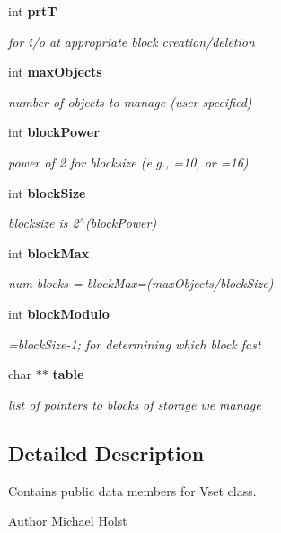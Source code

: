 \begin{DoxyCompactItemize}
int {\bf prtT}
\begin{DoxyCompactList}\small\item\em for i/o at appropriate block creation/deletion \item\end{DoxyCompactList}\item 
int {\bf maxObjects}
\begin{DoxyCompactList}\small\item\em number of objects to manage (user specified) \item\end{DoxyCompactList}\item 
int {\bf blockPower}
\begin{DoxyCompactList}\small\item\em power of 2 for blocksize (e.g., =10, or =16) \item\end{DoxyCompactList}\item 
int {\bf blockSize}
\begin{DoxyCompactList}\small\item\em blocksize is 2$^\wedge$(blockPower) \item\end{DoxyCompactList}\item 
int {\bf blockMax}
\begin{DoxyCompactList}\small\item\em num blocks = blockMax=(maxObjects/blockSize) \item\end{DoxyCompactList}\item 
int {\bf blockModulo}
\begin{DoxyCompactList}\small\item\em =blockSize-\/1; for determining which block fast \item\end{DoxyCompactList}\item 
char $\ast$$\ast$ {\bf table}
\begin{DoxyCompactList}\small\item\em list of pointers to blocks of storage we manage \item\end{DoxyCompactList}\end{DoxyCompactItemize}


\subsection{Detailed Description}
Contains public data members for Vset class. \begin{DoxyAuthor}{Author}
Michael Holst 
\end{DoxyAuthor}



